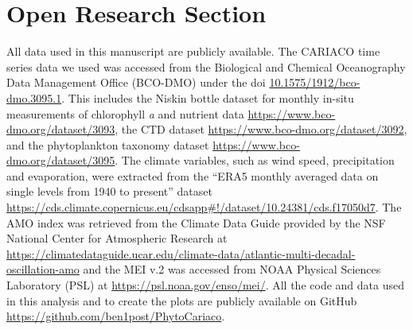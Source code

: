 \documentclass[draft]{agujournal2019}
\begin{document}
%








%
%

\section*{Open Research Section}
All data used in this manuscript are publicly available. The CARIACO time series data we used was accessed from the Biological and Chemical Oceanography Data Management Office (BCO-DMO) under the doi \url{10.1575/1912/bco-dmo.3095.1}. This includes the Niskin bottle dataset for monthly in-situ measurements of chlorophyll \textit{a} and nutrient data \url{https://www.bco-dmo.org/dataset/3093}, the CTD dataset \url{https://www.bco-dmo.org/dataset/3092}, and the phytoplankton taxonomy dataset \url{https://www.bco-dmo.org/dataset/3095}.
The climate variables, such as wind speed, precipitation and evaporation, were extracted from the ``ERA5 monthly averaged data on single levels from 1940 to present'' dataset \url{https://cds.climate.copernicus.eu/cdsapp#!/dataset/10.24381/cds.f17050d7}.
The AMO index was retrieved from the Climate Data Guide provided by the NSF National Center for Atmospheric Research at \url{https://climatedataguide.ucar.edu/climate-data/atlantic-multi-decadal-oscillation-amo} and the MEI v.2 was accessed from NOAA Physical Sciences Laboratory (PSL) at \url{https://psl.noaa.gov/enso/mei/}.
All the code and data used in this analysis and to create the plots are publicly available on GitHub \url{https://github.com/ben1post/PhytoCariaco}.
\end{document}
